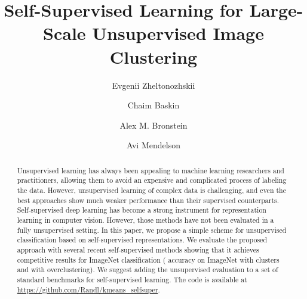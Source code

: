 \documentclass[runningheads]{llncs}
\begin{document}
\pagestyle{headings}
\mainmatter
\def\ECCVSubNumber{7380}  

\title{Self-Supervised Learning for Large-Scale Unsupervised Image Clustering} 

\begin{comment}
\titlerunning{ECCV-20 submission ID \ECCVSubNumber} 
\authorrunning{ECCV-20 submission ID \ECCVSubNumber} 
\author{Anonymous ECCV submission}
\institute{Paper ID \ECCVSubNumber}
\end{comment}




\newcommand*\samethanks[1][\value{footnote}]{\footnotemark[#1]}

\author{Evgenii Zheltonozhskii \and Chaim Baskin \and Alex M. Bronstein \and Avi Mendelson}


{\maketitle}



\begin{abstract}
Unsupervised learning has always been appealing to machine learning researchers and practitioners, allowing them to avoid an expensive and complicated process of labeling the data. However, unsupervised learning of complex data is challenging, and even the best approaches show much weaker performance than their supervised counterparts.  
Self-supervised deep learning has become a strong instrument for representation learning in computer vision. However, those methods have not been evaluated in a fully unsupervised setting. In this paper, we propose a simple scheme for unsupervised classification based on self-supervised representations. We evaluate the proposed approach with several recent self-supervised methods showing that it achieves competitive results for ImageNet classification ( accuracy on ImageNet with  clusters and  with overclustering). We suggest adding the unsupervised evaluation to a set of standard benchmarks for self-supervised learning.  The code is available at \url{https://github.com/Randl/kmeans_selfsuper}.
\end{abstract}
\end{document}
